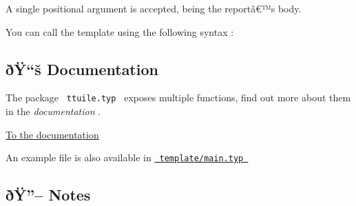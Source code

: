 A single positional argument is accepted, being the reportâ€™s body.

You can call the template using the following syntax :

\begin{Shaded}
\begin{Highlighting}[]


\NormalTok{  ),}
\NormalTok{)}
\end{Highlighting}
\end{Shaded}

\subsection{ðŸ``š Documentation}\label{uxf0uxffux161-documentation}

The package \texttt{\ ttuile.typ\ } exposes multiple functions, find out
more about them in the \emph{documentation} .

\href{https://github.com/vitto4/ttuile/blob/main/DOC.EN.md}{To the
documentation}

An example file is also available in
\href{https://github.com/vitto4/ttuile/blob/main/template/main.typ}{\texttt{\ template/main.typ\ }}

\subsection{ðŸ''-- Notes}\label{uxf0uxff-notes}

